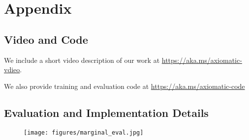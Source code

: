 \documentclass{article} %
\begin{document}






\newpage

\appendix
\section{Appendix}


\subsection{Video and Code}

We include a short video description of our work at {\color{blue} \url{https://aka.ms/axiomatic-vdieo}}.

We also provide training and evaluation code at {\color{blue} \url{https://aka.ms/axiomatic-code}}

\subsection{Evaluation and Implementation Details}
\label{sec:eval-details}

\begin{figure}[h]
\centering
\texttt{[image: figures/marginal\_eval.jpg]}
\label{fig:marginal-eval}
\end{figure}
\end{document}
